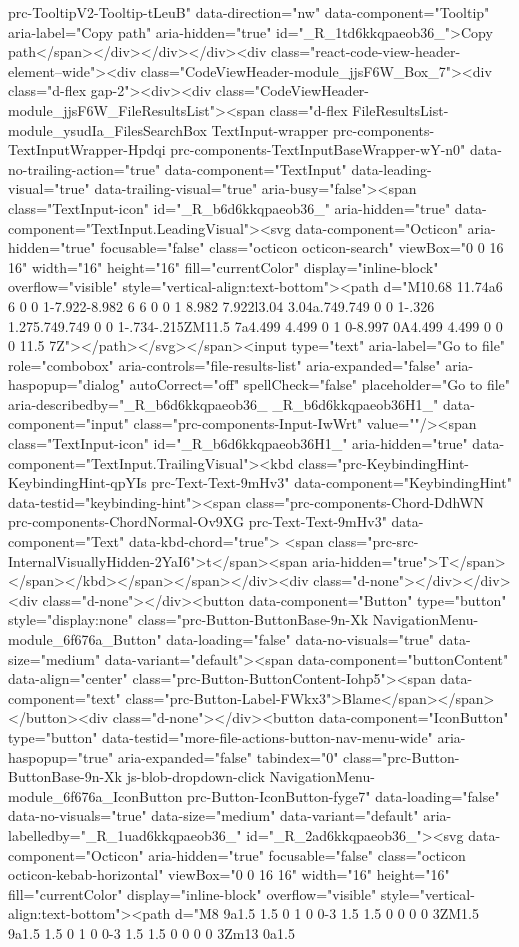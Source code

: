 prc-TooltipV2-Tooltip-tLeuB" data-direction="nw" data-component="Tooltip" aria-label="Copy path" aria-hidden="true" id="_R_1td6kkqpaeob36_">Copy path</span></div></div></div><div class="react-code-view-header-element--wide"><div class="CodeViewHeader-module_jjsF6W_Box_7"><div class="d-flex gap-2"><div><div class="CodeViewHeader-module_jjsF6W_FileResultsList"><span class="d-flex FileResultsList-module_ysudIa_FilesSearchBox TextInput-wrapper prc-components-TextInputWrapper-Hpdqi prc-components-TextInputBaseWrapper-wY-n0" data-no-trailing-action="true" data-component="TextInput" data-leading-visual="true" data-trailing-visual="true" aria-busy="false"><span class="TextInput-icon" id="_R_b6d6kkqpaeob36_" aria-hidden="true" data-component="TextInput.LeadingVisual"><svg data-component="Octicon" aria-hidden="true" focusable="false" class="octicon octicon-search" viewBox="0 0 16 16" width="16" height="16" fill="currentColor" display="inline-block" overflow="visible" style="vertical-align:text-bottom"><path d="M10.68 11.74a6 6 0 0 1-7.922-8.982 6 6 0 0 1 8.982 7.922l3.04 3.04a.749.749 0 0 1-.326 1.275.749.749 0 0 1-.734-.215ZM11.5 7a4.499 4.499 0 1 0-8.997 0A4.499 4.499 0 0 0 11.5 7Z"></path></svg></span><input type="text" aria-label="Go to file" role="combobox" aria-controls="file-results-list" aria-expanded="false" aria-haspopup="dialog" autoCorrect="off" spellCheck="false" placeholder="Go to file" aria-describedby="_R_b6d6kkqpaeob36_ _R_b6d6kkqpaeob36H1_" data-component="input" class="prc-components-Input-IwWrt" value=""/><span class="TextInput-icon" id="_R_b6d6kkqpaeob36H1_" aria-hidden="true" data-component="TextInput.TrailingVisual"><kbd class="prc-KeybindingHint-KeybindingHint-qpYIs prc-Text-Text-9mHv3" data-component="KeybindingHint" data-testid="keybinding-hint"><span class="prc-components-Chord-DdhWN prc-components-ChordNormal-Ov9XG prc-Text-Text-9mHv3" data-component="Text" data-kbd-chord="true"> <span class="prc-src-InternalVisuallyHidden-2YaI6">t</span><span aria-hidden="true">T</span></span></kbd></span></span></div><div class="d-none"></div></div><div class="d-none"></div><button data-component="Button" type="button" style="display:none" class="prc-Button-ButtonBase-9n-Xk NavigationMenu-module_6f676a_Button" data-loading="false" data-no-visuals="true" data-size="medium" data-variant="default"><span data-component="buttonContent" data-align="center" class="prc-Button-ButtonContent-Iohp5"><span data-component="text" class="prc-Button-Label-FWkx3">Blame</span></span></button><div class="d-none"></div><button data-component="IconButton" type="button" data-testid="more-file-actions-button-nav-menu-wide" aria-haspopup="true" aria-expanded="false" tabindex="0" class="prc-Button-ButtonBase-9n-Xk js-blob-dropdown-click NavigationMenu-module_6f676a_IconButton prc-Button-IconButton-fyge7" data-loading="false" data-no-visuals="true" data-size="medium" data-variant="default" aria-labelledby="_R_1uad6kkqpaeob36_" id="_R_2ad6kkqpaeob36_"><svg data-component="Octicon" aria-hidden="true" focusable="false" class="octicon octicon-kebab-horizontal" viewBox="0 0 16 16" width="16" height="16" fill="currentColor" display="inline-block" overflow="visible" style="vertical-align:text-bottom"><path d="M8 9a1.5 1.5 0 1 0 0-3 1.5 1.5 0 0 0 0 3ZM1.5 9a1.5 1.5 0 1 0 0-3 1.5 1.5 0 0 0 0 3Zm13 0a1.5 